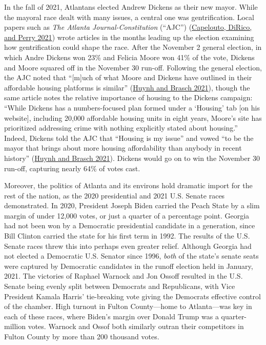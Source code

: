 \documentclass[
  12pt,
]{article}
\begin{document}
In the fall of 2021, Atlantans elected Andrew Dickens as their new mayor. While the mayoral race dealt with many issues, a central one was gentrification. Local papers such as \emph{The Atlanta Journal-Constitution} (``AJC'') (\protect\hyperlink{ref-Capelouto2021}{Capelouto, DiRico, and Perry 2021}) wrote articles in the months leading up the election examining how gentrification could shape the race. After the November 2 general election, in which Andre Dickens won 23\% and Felicia Moore won 41\% of the vote, Dickens and Moore squared off in the November 30 run-off. Following the general election, the AJC noted that ``{[}m{]}uch of what Moore and Dickens have outlined in their affordable housing platforms is similar'' (\protect\hyperlink{ref-Huynh2021}{Huynh and Brasch 2021}), though the same article notes the relative importance of housing to the Dickens campaign: ``While Dickens has a numbers-focused plan formed under a `Housing' tab {[}on his website{]}, including 20,000 affordable housing units in eight years, Moore's site has prioritized addressing crime with nothing explicitly stated about housing.'' Indeed, Dickens told the AJC that ``Housing is my issue'' and vowed ``to be the mayor that brings about more housing affordability than anybody in recent history'' (\protect\hyperlink{ref-Huynh2021}{Huynh and Brasch 2021}). Dickens would go on to win the November 30 run-off, capturing nearly 64\% of votes cast.

Moreover, the politics of Atlanta and its environs hold dramatic import for the rest of the nation, as the 2020 presidential and 2021 U.S. Senate races demonstrated. In 2020, President Joseph Biden carried the Peach State by a slim margin of under 12,000 votes, or just a quarter of a percentage point. Georgia had not been won by a Democratic presidential candidate in a generation, since Bill Clinton carried the state for his first term in 1992. The results of the U.S. Senate races threw this into perhaps even greater relief. Although Georgia had not elected a Democratic U.S. Senator since 1996, \emph{both} of the state's senate seats were captured by Democratic candidates in the runoff election held in January, 2021. The victories of Raphael Warnock and Jon Ossoff resulted in the U.S. Senate being evenly split between Democrats and Republicans, with Vice President Kamala Harris' tie-breaking vote giving the Democrats effective control of the chamber. High turnout in Fulton County---home to Atlanta---was key in each of these races, where Biden's margin over Donald Trump was a quarter-million votes. Warnock and Ossof both similarly outran their competitors in Fulton County by more than 200 thousand votes.
\end{document}
